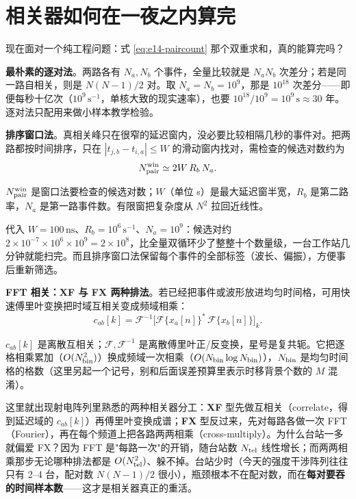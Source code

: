 \section{相关器如何在一夜之内算完}
\label{sec:e14-scaling}

现在面对一个纯工程问题：式 \eqref{eq:e14-paircount} 那个双重求和，真的能算完吗？

\textbf{最朴素的逐对法}。两路各有 \(N_a,N_b\) 个事件，全量比较就是 \(N_aN_b\) 次差分；若是同一路自相关，则是 \(N(N-1)/2\) 对。取 \(N_a=N_b=10^{9}\)，那是 \(10^{18}\) 次差分——即便每秒十亿次（\(10^{9}\,\mathrm{s^{-1}}\)，单核大致的现实速率），也要 \(10^{18}/10^{9}=10^{9}\,\mathrm s\approx30\) 年。逐对法只配用来做小样本教学检验。

\textbf{排序窗口法}。真相关峰只在很窄的延迟窗内，没必要比较相隔几秒的事件对。把两路都按时间排序，只在 \(|t_{j,b}-t_{i,a}|\le W\) 的滑动窗内找对，需检查的候选对数约为
\begin{equation}
  N_{\rm pair}^{\rm win}\simeq 2W\,R_b\,N_a .
  \label{eq:e14-window}
\end{equation}
\begin{formulaexplain}
\(N_{\rm pair}^{\rm win}\) 是窗口法要检查的候选对数；\(W\)（单位 s）是最大延迟窗半宽，\(R_b\) 是第二路率，\(N_a\) 是第一路事件数。有限窗把复杂度从 \(N^2\) 拉回近线性。
\end{formulaexplain}
代入 \(W=100\,\mathrm{ns}\)、\(R_b=10^{6}\,\mathrm{s^{-1}}\)、\(N_a=10^{9}\)：候选对约 \(2\times10^{-7}\times10^{6}\times10^{9}=2\times10^{8}\)，比全量双循环少了整整十个数量级，一台工作站几分钟就能扫完。而且排序窗口法保留每个事件的全部标签（波长、偏振），方便事后重新筛选。

\textbf{FFT 相关：XF 与 FX 两种排法}。若已经把事件或波形放进均匀时间格，可用快速傅里叶变换把时域互相关变成频域相乘：
\begin{equation}
  c_{ab}[k]
  =\mathcal F^{-1}\!\Big[\mathcal F\{x_a[n]\}^{*}\,\mathcal F\{x_b[n]\}\Big]_k .
  \label{eq:e14-fft}
\end{equation}
\begin{formulaexplain}
\(c_{ab}[k]\) 是离散互相关；\(\mathcal F,\mathcal F^{-1}\) 是离散傅里叶正/反变换，星号是复共轭。它把逐格相乘累加（\(O(N_{\rm bin}^2)\)）换成频域一次相乘（\(O(N_{\rm bin}\log N_{\rm bin})\)），\(N_{\rm bin}\) 是均匀时间格的格数（这里另起一个记号，别和后面误差预算里表示时移背景个数的 \(M\) 混淆）。
\end{formulaexplain}
这里就出现射电阵列里熟悉的两种相关器分工：\textbf{XF} 型先做互相关（correlate，得到延迟域的 \(c_{ab}[k]\)）再傅里叶变换成谱；\textbf{FX} 型反过来，先对每路各做一次 FFT（Fourier），再在每个频道上把各路两两相乘（cross-multiply）。为什么台站一多就偏爱 FX？因为 FFT 是"每路一次"的开销，随台站数 \(N_{\rm tel}\) 线性增长；而两两相乘那步无论哪种排法都是 \(O(N_{\rm tel}^{2})\)、躲不掉。台站少时（今天的强度干涉阵列往往只有 2–4 台，配对数 \(N(N-1)/2\) 很小），瓶颈根本不在配对数，而在\textbf{每对要吞的时间样本数}——这才是相关器真正的重活。


